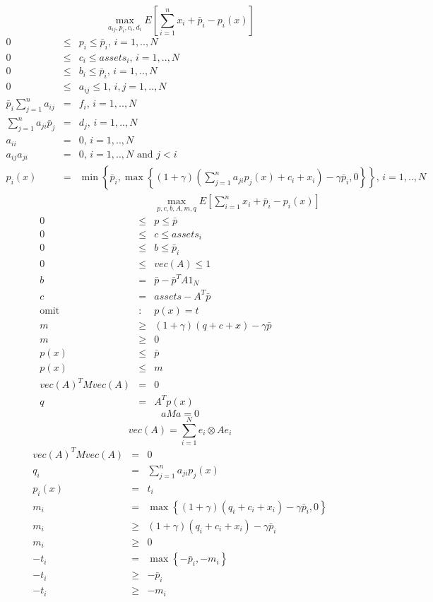 \documentclass{article}
\begin{document}
\[
\max_{a_{ij},p_{i},c_{i},d_{i}}E\left[ \sum_{i=1}^{n}x_{i}+\bar{p}%
_{i}-p_{i}\left( x\right) \right] 
\]%
\begin{eqnarray*}
0 &\leq &p_{i}\leq \bar{p}_{i}\text{, }i=1,..,N \\
0 &\leq &c_{i}\leq assets_{i}\text{, }i=1,..,N \\
0 &\leq &b_{i}\leq \bar{p}_{i}\text{, }i=1,..,N \\
0 &\leq &a_{ij}\leq 1\text{, }i,j=1,..,N \\
\bar{p}_{i}\sum_{j=1}^{n}a_{ij} &=&f_{i}\text{, }i=1,..,N \\
\sum_{j=1}^{n}a_{ji}\bar{p}_{j} &=&d_{j}\text{, }i=1,..,N \\
a_{ii} &=&0\text{, }i=1,..,N \\
a_{ij}a_{ji} &=&0\text{, }i=1,..,N\text{ and }j<i \\
p_{i}\left( x\right)  &=&\min \left\{ \bar{p}_{i},\max \left\{ \left(
1+\gamma \right) \left( \sum_{j=1}^{n}a_{ji}p_{j}\left( x\right)
+c_{i}+x_{i}\right) -\gamma \bar{p}_{i},0\right\} \right\} \text{, }i=1,..,N
\end{eqnarray*}%
\begin{eqnarray*}
&&\max_{p,c,b,A,m,q}E\left[ \sum_{i=1}^{n}x_{i}+\bar{p}_{i}-p_{i}\left(
x\right) \right]  \\
0 &\leq &p\leq \bar{p} \\
0 &\leq &c\leq assets_{i} \\
0 &\leq &b\leq \bar{p}_{i} \\
0 &\leq &vec\left( A\right) \leq 1 \\
b &=&\bar{p}-\bar{p}^{T}A1_{N} \\
c &=&assets-A^{T}\bar{p} \\
\text{omit} &\text{:}&p\left( x\right) =t \\
m &\geq &\left( 1+\gamma \right) \left( q+c+x\right) -\gamma \bar{p} \\
m &\geq &0 \\
p\left( x\right)  &\leq &\bar{p} \\
p\left( x\right)  &\leq &m \\
vec\left( A\right) ^{T}Mvec\left( A\right)  &=&0 \\
q &=&A^{T}p\left( x\right) 
\end{eqnarray*}%
\[
aMa=0
\]%
\[
vec\left( A\right) =\sum_{i=1}^{N}e_{i}\otimes Ae_{i}
\]%
\begin{eqnarray*}
vec\left( A\right) ^{T}Mvec\left( A\right)  &=&0 \\
q_{i} &=&\sum_{j=1}^{n}a_{ji}p_{j}\left( x\right)  \\
p_{i}\left( x\right)  &=&t_{i} \\
m_{i} &=&\max \left\{ \left( 1+\gamma \right) \left(
q_{i}+c_{i}+x_{i}\right) -\gamma \bar{p}_{i},0\right\}  \\
m_{i} &\geq &\left( 1+\gamma \right) \left( q_{i}+c_{i}+x_{i}\right) -\gamma 
\bar{p}_{i} \\
m_{i} &\geq &0 \\
-t_{i} &=&\max \left\{ -\bar{p}_{i},-m_{i}\right\}  \\
-t_{i} &\geq &-\bar{p}_{i} \\
-t_{i} &\geq &-m_{i}
\end{eqnarray*}
\end{document}
